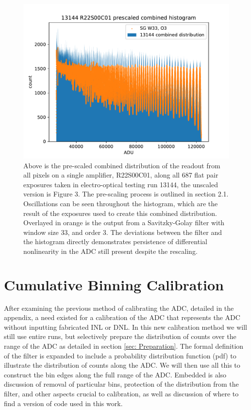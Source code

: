 \documentclass[11pt, letterpaper]{article}
\begin{document}
\begin{figure}
    \centering
    \includegraphics[width=0.5\linewidth]{bar13144.pdf}
    \caption{Above is the pre-scaled combined distribution of the readout from all pixels on a single amplifier, R22S00C01, along all 687 flat pair exposures taken in electro-optical testing run 13144, the unscaled version is Figure 3. The pre-scaling process is outlined in section 2.1. Oscillations can be seen throughout the histogram, which are the result of the exposures used to create this combined distribution. Overlayed in orange is the output from a Savitzky-Golay filter with window size 33, and order 3. The deviations between the filter and the histogram directly demonstrates persistence of differential nonlinearity in the ADC still present despite the rescaling.}
    \label{fig:scaled13144}
\end{figure}

\section{Cumulative Binning Calibration}
\label{sec: Cummulative binning}
\indent


After examining the previous method of calibrating the ADC, detailed in the appendix, a need existed for a calibration of the ADC that represents the ADC without inputting fabricated INL or DNL. 
In this new calibration method we will still use entire runs, but selectively prepare the distribution of counts over the range of the ADC as detailed in section \ref{sec: Preparation}. 
The formal definition of the filter is expanded to include a probability distribution function (pdf) to illustrate the distribution of counts along the ADC. 
We will then use all this to construct the bin edges along the full range of the ADC. 
Embedded is also discussion of removal of particular bins, protection of the distribution from the filter, and other aspects crucial to calibration, as well as discussion of where to find a version of code used in this work.
\end{document}

